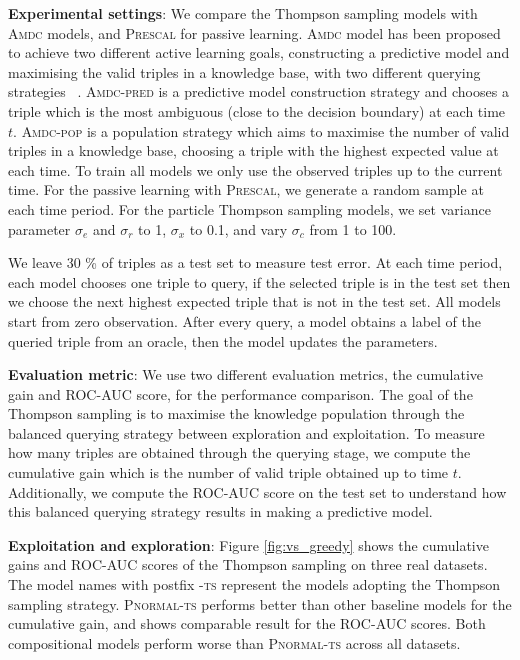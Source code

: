 %

\textbf{Experimental settings}:
We compare the Thompson sampling models with \textsc{Amdc} models, and \textsc{Prescal} for passive learning.
\textsc{Amdc} model has been proposed to achieve two different active learning goals, constructing a predictive
model and maximising the valid triples in a knowledge base, with two different querying strategies
~\cite{kajino2015active}.
\textsc{Amdc-pred} is a predictive model construction strategy and chooses a triple which is the most ambiguous (close to the decision boundary) at each time $t$.
\textsc{Amdc-pop} is a population strategy which aims to maximise the number of valid triples in a knowledge base, choosing a triple with the highest expected value at each time.
To train all models we only use the observed triples up to the current time.
For the passive learning with \textsc{Prescal}, we generate a random sample at each time period.
For the particle Thompson sampling models, we set variance parameter $\sigma_e$ and $\sigma_r$ to 1, $\sigma_x$ to 0.1, and vary $\sigma_c$ from 1 to 100.

We leave 30 \% of triples as a test set to measure test error.
At each time period, each model chooses one triple to query,
if the selected triple is in the test set then we choose the next highest expected triple that is not in the test set.
All models start from zero observation.
After every query, a model obtains a label of the queried triple from an oracle,
then the model updates the parameters.

\textbf{Evaluation metric}: We use two different evaluation metrics, the cumulative gain and ROC-AUC score,
for the performance comparison. The goal of the Thompson sampling is to maximise the knowledge
population through the balanced querying strategy between exploration and exploitation.
To measure how many triples are obtained through the querying stage, we compute the cumulative
gain which is the number of valid triple obtained up to time $t$. Additionally, we compute the ROC-AUC score on
the test set to understand how this balanced querying strategy results in making a predictive model.

\textbf{Exploitation and exploration}:
Figure \ref{fig:vs_greedy} shows
the cumulative gains and ROC-AUC scores of the Thompson sampling on three real datasets. The model names with postfix \textsc{-ts} represent the models adopting the Thompson sampling strategy.
\textsc{Pnormal-ts} performs better than other baseline models for the cumulative gain, and shows comparable result for the ROC-AUC scores. Both compositional models perform worse than \textsc{Pnormal-ts} across all datasets.

